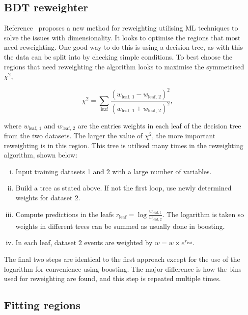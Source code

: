 \subsection{BDT reweighter}

Reference~\cite{Rogozhnikov:2016bdp} proposes a new method for reweighting utilising \ac{ML} techniques to solve the issues with dimensionality. 
It looks to optimise the regions that most need reweighting. 
One good way to do this is using a decision tree, as with this the data can be split into  by checking simple conditions.
To best choose the regions that need reweighting the algorithm looks to maximise the symmetrised $\chi^2$,

\begin{equation}
\chi^2 = \sum_{\text{leaf}} \frac{(w_{\text{leaf, 1}}-w_{\text{leaf, 2}})^2}{(w_{\text{leaf, 1}}+w_{\text{leaf, 2}})^2},
\end{equation}

where $w_{\text{leaf, 1}}$ and $w_{\text{leaf, 2}}$ are the entries weights in each leaf of the decision tree from the two datasets.
The larger the value of $\chi^2$, the more important reweighting is in this region. 
This tree is utilised many times in the reweighting algorithm, shown below:

\begin{enumerate}[i)]
\item Input training datasets 1 and 2 with a large number of variables.
\item Build a tree as stated above. If not the first loop, use newly determined weights for dataset 2.
\item Compute predictions in the leafs $r_{\text{leaf}} = \log\frac{w_{\text{leaf, 1}}}{w_{\text{leaf, 2}}}$. The logarithm is taken so weights in different trees can be summed as usually done in boosting.
\item In each leaf, dataset 2 events are weighted by $w = w \times e^{r_{\text{leaf}}}$.
\end{enumerate}

The final two steps are identical to the first approach except for the use of the logarithm for convenience using boosting. 
The major difference is how the bins used for reweighting are found, and this step is repeated multiple times. \\

\subsection{Fitting regions}

